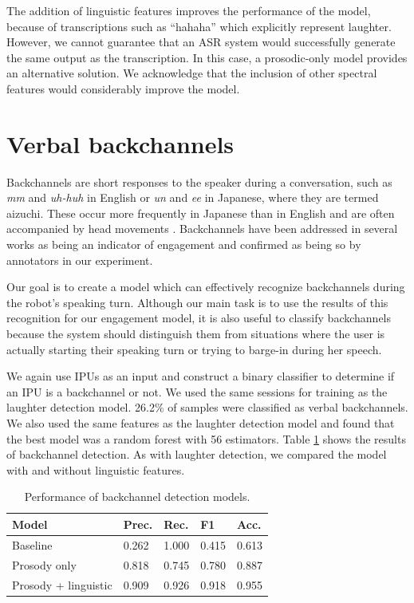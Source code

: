 \documentclass[letterpaper]{article} %
\begin{document}
The addition of linguistic features improves the performance of the model, because of transcriptions such as ``hahaha'' which explicitly represent laughter. However, we cannot guarantee that an ASR system would successfully generate the same output as the transcription. In this case, a prosodic-only model provides an alternative solution. We acknowledge that the inclusion of other spectral features would considerably improve the model.

\section{Verbal backchannels}
Backchannels are short responses to the speaker during a conversation, such as \textit{mm} and \textit{uh-huh} in English or \textit{un} and \textit{ee} in Japanese, where they are termed aizuchi. These occur more frequently in Japanese than in English and are often accompanied by head movements \cite{Ike2010}. Backchannels have been addressed in several works as being an indicator of engagement \cite{Rich2010,Oertel2015} and confirmed as being so by annotators in our experiment.

Our goal is to create a model which can effectively recognize backchannels during the robot's speaking turn. Although our main task is to use the results of this recognition for our engagement model, it is also useful to classify backchannels because the system should distinguish them from situations where the user is actually starting their speaking turn or trying to barge-in during her speech.

We again use IPUs as an input and construct a binary classifier to determine if an IPU is a backchannel or not. We used the same sessions for training as the laughter detection model. 26.2\% of samples were classified as verbal backchannels. We also used the same features as the laughter detection model and found that the best model was a random forest with 56 estimators. Table \ref{bcresults} shows the results of backchannel detection. As with laughter detection, we compared the model with and without linguistic features.

\begin{table}[h]
\begin{center}
\begin{tabular}{|l|l|l|l|l|}
\hline \bf Model & \bf Prec. & \bf Rec. & \bf F1 & \bf Acc. \\ \hline
Baseline & 0.262 & 1.000 & 0.415 & 0.613 \\
Prosody only & 0.818 & 0.745 & 0.780 & 0.887 \\
Prosody + linguistic & 0.909 & 0.926 & 0.918 & 0.955\\
\hline
\end{tabular}
\end{center}
\caption{\label{bcresults} Performance of backchannel detection models.}
\end{table}
\end{document}
